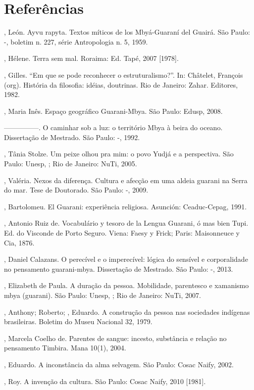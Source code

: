\section{Referências}

\begin{Parskip}
, León. Ayvu rapyta. Textos míticos de los Mbyá-Guaraní del
Guairá. São Paulo: -, boletim n. 227, série Antropologia n. 5,
1959.

, Hélene. Terra sem mal. Roraima: Ed. Tapé, 2007 [1978].

, Gilles. ``Em que se pode reconhecer o estruturalismo?''.
In: Châtelet, François  (org). História da filosofia: idéias,
doutrinas. Rio de Janeiro: Zahar. Editores, 1982.

, Maria Inês. Espaço geográfico Guarani-Mbya. São Paulo:
Edusp, 2008.

—————. O caminhar sob a luz: o território Mbya à beira do oceano. 
Dissertação de Mestrado. São Paulo: -, 1992.

, Tânia Stolze. Um peixe olhou pra mim: o povo Yudjá e a
perspectiva. São Paulo: Unesp, ; Rio de Janeiro: NuTi, 2005.

, Valéria. Nexos da diferença. Cultura e afecção em uma
aldeia guarani na Serra do mar. Tese de Doutorado. São Paulo:
-, 2009.

, Bartolomeu. El Guarani: experiência religiosa. Asunción:
Ceaduc-Cepag, 1991.

, Antonio Ruiz de. Vocabulário y tesoro de la Lengua
Guarani, ó mas bien Tupi. Ed. do Visconde de Porto Seguro. Viena: Faesy
y Frick; Paris: Maisonneuce y Cia, 1876.

, Daniel Calazans. O perecível e o imperecível: lógica do
sensível e corporalidade no pensamento guarani-mbya. Dissertação de
Mestrado. São Paulo: -, 2013.

, Elizabeth de Paula. A duração da pessoa. Mobilidade,
parentesco e xamanismo mbya (guarani). São Paulo: Unesp, ; Rio de
Janeiro: NuTi, 2007.

, Anthony;   Roberto;   , Eduardo. A
construção da pessoa nas sociedades indígenas brasileiras. Boletim do
Museu Nacional 32, 1979. 

, Marcela Coelho de. Parentes de sangue: incesto, substância
e relação no pensamento Timbira. Mana 10(1), 2004.

  , Eduardo. A inconstância da alma selvagem. São
Paulo: Cosac Naify, 2002.

, Roy. A invenção da cultura. São Paulo: Cosac Naify, 2010
[1981].
\end{Parskip}


